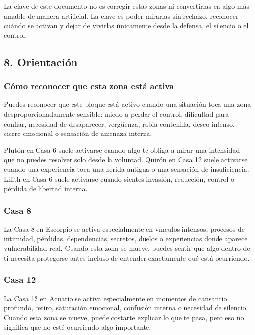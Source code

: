 \documentclass[11pt,a4paper]{article}
\begin{document}
La clave de este documento no es corregir estas zonas ni convertirlas en algo más amable de manera artificial. La clave es poder mirarlas sin rechazo, reconocer cuándo se activan y dejar de vivirlas únicamente desde la defensa, el silencio o el control.

\vspace{0.4cm}

\subsection{8. Orientación}

\subsubsection*{Cómo reconocer que esta zona está activa}
Puedes reconocer que este bloque está activo cuando una situación toca una zona desproporcionadamente sensible: miedo a perder el control, dificultad para confiar, necesidad de desaparecer, vergüenza, rabia contenida, deseo intenso, cierre emocional o sensación de amenaza interna.

Plutón en Casa 6 suele activarse cuando algo te obliga a mirar una intensidad que no puedes resolver solo desde la voluntad. Quirón en Casa 12 suele activarse cuando una experiencia toca una herida antigua o una sensación de insuficiencia. Lilith en Casa 6 suele activarse cuando sientes invasión, reducción, control o pérdida de libertad interna.

\subsubsection*{Casa 8}
La Casa 8 en Escorpio se activa especialmente en vínculos intensos, procesos de intimidad, pérdidas, dependencias, secretos, duelos o experiencias donde aparece vulnerabilidad real. Cuando esta zona se mueve, puedes sentir que algo dentro de ti necesita protegerse antes incluso de entender exactamente qué está ocurriendo.

\subsubsection*{Casa 12}
La Casa 12 en Acuario se activa especialmente en momentos de cansancio profundo, retiro, saturación emocional, confusión interna o necesidad de silencio. Cuando esta zona se mueve, puede costarte explicar lo que te pasa, pero eso no significa que no esté ocurriendo algo importante.
\end{document}
